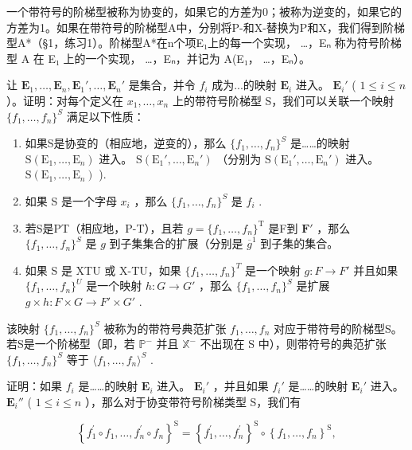 一个带符号的阶梯型被称为协变的，如果它的方差为0；被称为逆变的，如果它的方差为1。如果在带符号的阶梯型A中，分别将P-和X-替换为P和X，我们得到阶梯型A*（§1，练习1）。阶梯型A*在n个项E₁上的每一个实现， \ldots，Eₙ 称为符号阶梯型 A 在 E₁ 上的一个实现， \ldots，Eₙ，并记为 A(E₁， \ldots，Eₙ）。

让 \(\mathbf{E}_1, \ldots, \mathbf{E}_n, \mathbf{E}_1', \ldots, \mathbf{E}_n'\) 是集合，并令 \(f_i\) 成为...的映射 \(\mathbf{E}_i\) 进入。 \(\mathbf{E}_i'\) ( \(1 \leqslant i \leqslant n\) ）。证明：对每个定义在 \(x_1, \ldots, x_n\) 上的带符号阶梯型 S，我们可以关联一个映射 \(\{f_1, \ldots, f_n\}^{S}\) 满足以下性质：

\begin{enumerate}
\def\labelenumi{(\roman{enumi})}
\item
  如果S是协变的（相应地，逆变的），那么 \(\{f_1, \ldots, f_n\}^{S}\) 是……的映射 \(\mathrm{S}(\mathrm{E}_1, \ldots, \mathrm{E}_n)\) 进入。 \(\mathrm{S}(\mathrm{E}_1', \ldots, \mathrm{E}_n')\) （分别为 \(\mathrm{S}(\mathrm{E}_1', \ldots, \mathrm{E}_n')\) 进入。 \(\mathrm{S}(\mathrm{E}_1, \ldots, \mathrm{E}_n)\) ).
\item
  如果 S 是一个字母 \(x_{i}\) ，那么 \(\{f_1, \ldots, f_n\}^{S}\) 是 \(f_{i}\) .
\item
  若S是PT（相应地，P-T），且若 \(g = \{f_1, \ldots, f_n\}^{\mathrm{T}}\) 是F到 \(\mathbf{F}'\) ，那么 \(\{f_1, \ldots, f_n\}^{S}\) 是 \(g\) 到子集集合的扩展（分别是 \(\overline{g}^1\) 到子集的集合。
\item
  如果 S 是 XTU 或 X-TU，如果 \(\{f_{1},\ldots,f_{n}\}^{T}\) 是一个映射 \(g:F\to F'\) 并且如果 \(\{f_{1},\ldots,f_{n}\}^{U}\) 是一个映射 \(h:G\to G'\) ，那么 \(\{f_{1},\ldots,f_{n}\}^{S}\) 是扩展 \(g\times h:F\times G\to F'\times G'\) .
\end{enumerate}

该映射 \(\{f_1, \ldots, f_n\}^{S}\) 被称为的带符号典范扩张 \(f_1, \ldots, f_n\) 对应于带符号的阶梯型S。若S是一个阶梯型（即，若 \(\mathbb{P}^{-}\) 并且 \(\mathbb{X}^{-}\) 不出现在 S 中），则带符号的典范扩张 \(\{f_1, \ldots, f_n\}^{S}\) 等于 \(\langle f_1, \ldots, f_n \rangle^{S}\) .

证明：如果 \(f_{i}\) 是……的映射 \(\mathbf{E}_i\) 进入。 \(\mathbf{E}_i'\) ，并且如果 \(f_{i}'\) 是……的映射 \(\mathbf{E}_i'\) 进入。 \(\mathbf{E}_i''\) ( \(1 \leqslant i \leqslant n\) ），那么对于协变带符号阶梯类型 S，我们有

\[
\left\{f _ {1} ^ {\prime} \circ f _ {1}, \dots , f _ {n} ^ {\prime} \circ f _ {n} \right\} ^ {\mathrm{S}} = \left\{f _ {1} ^ {\prime}, \dots , f _ {n} ^ {\prime} \right\} ^ {\mathrm{S}} \circ \left\{f _ {1}, \dots , f _ {n} \right\} ^ {\mathrm{S}},
\]

